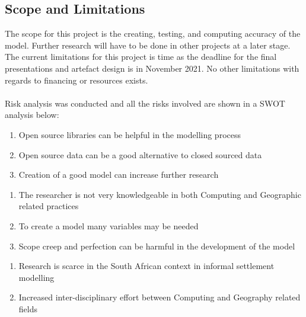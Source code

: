 \subsection{Scope and Limitations}
The scope for this project is the creating, testing, and computing accuracy of the model. Further research will have to be done in other projects at a later stage. The current limitations for this project is time as the deadline for the final presentations and artefact design is in November 2021. No other limitations with regards to financing or resources exists.\\\\
Risk analysis was conducted and all the risks involved are shown in a SWOT analysis below:
\begin{tcbraster}[raster columns=2, boxrule=0mm, arc=0mm]
\begin{tcolorbox}[equal height group=A, size=fbox, colback=swotS!60, colframe=swotS!80!black, title=\textsc{strengths}]
\begin{enumerate}
\item Open source libraries can be helpful in the modelling process
\item Open source data can be a good alternative to closed sourced data
\item Creation of a good model can increase further research
\end{enumerate}
\end{tcolorbox}
\begin{tcolorbox}[equal height group=A, size=fbox, colback=swotW!60, colframe=swotW!80!black, title=\textsc{weaknesses}]
\begin{enumerate}
\item The researcher is not very knowledgeable in both Computing and Geographic related practices
\item To create a model many variables may be needed
\item Scope creep and perfection can be harmful in the development of the model
\end{enumerate}
\end{tcolorbox}
\begin{tcolorbox}[equal height group=B, size=fbox, colback=swotO!60, colframe=swotO!80!black, title=\textsc{opportunities}]
\begin{enumerate}
\item Research is scarce in the South African context in informal settlement modelling
\item Increased inter-disciplinary effort between Computing and Geography related fields

\end{enumerate}
\end{tcolorbox}
\end{tcbraster}
